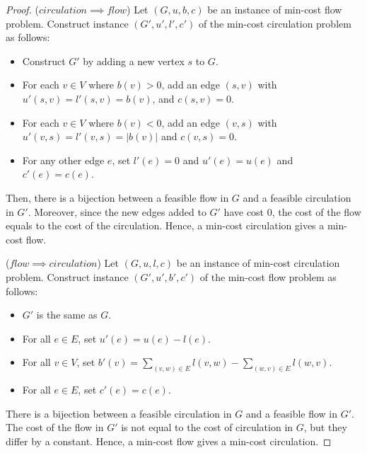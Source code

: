 \documentclass[10pt]{article}
\begin{document}
\begin{itemize}
        \begin{proof}
          ($circulation \implies flow$) Let $(G, u, b, c)$ be an instance of
            min-cost flow problem. Construct instance $(G', u', l', c')$ of
            the min-cost circulation problem as follows:
            \begin{itemize}
              \item Construct $G'$ by adding a new vertex $s$ to $G$.
              \item For each $v \in V$ where $b(v) > 0$, add an edge $(s,v)$
                with $u'(s,v) = l'(s,v) = b(v)$, and $c(s,v) = 0$.
              \item For each $v \in V$ where $b(v) < 0$, add an edge $(v,s)$
                with $u'(v,s) = l'(v,s) = |b(v)|$ and $c(v,s) = 0$.
              \item For any other edge $e$, set $l'(e) = 0$ and
                $u'(e) = u(e)$ and $c'(e) = c(e)$.
            \end{itemize}
            Then, there is a bijection between a feasible flow in $G$ and 
            a feasible circulation in $G'$. Moreover, since the new edges
            added to $G'$ have cost 0, the cost of the flow equals to
            the cost of the circulation. Hence, a min-cost circulation
            gives a min-cost flow.
            
          ($flow \implies circulation$) Let $(G, u, l, c)$ be an instance 
            of min-cost circulation problem. Construct instance $(G', u', b', c')$
            of the min-cost flow problem as follows:
            \begin{itemize}
              \item $G'$ is the same as $G$.
              \item For all $e \in E$, set $u'(e) = u(e) - l(e)$.
              \item For all $v \in V$, set $b'(v) = \sum_{(v,w) \in E} l(v,w) - \sum_{(w,v) \in E} l(w,v)$.
              \item For all $e \in E$, set $c'(e) = c(e).$
            \end{itemize}
            There is a bijection between a feasible circulation in $G$
            and a feasible flow in $G'$. The cost of the flow in $G'$
            is not equal to the cost of circulation in $G$, but they
            differ by a constant. Hence, a min-cost flow gives a
            min-cost circulation.
        \end{proof}
        

\end{itemize}
\end{document}
